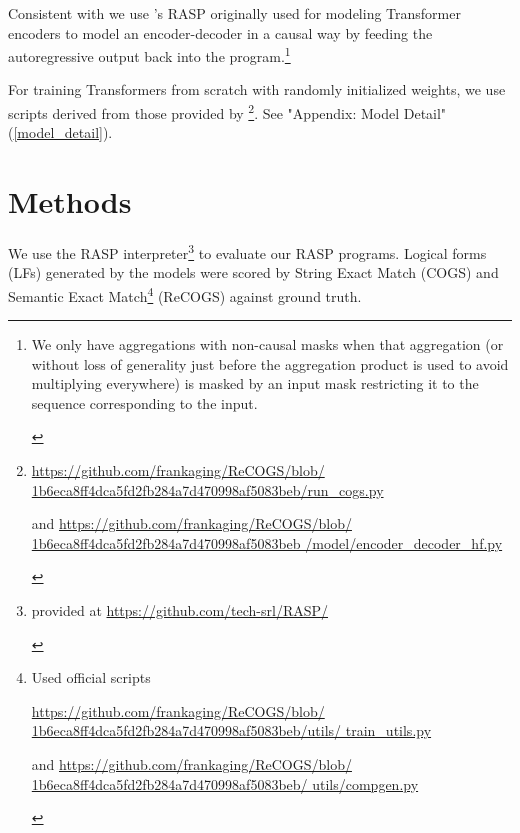\documentclass[11pt]{article}
\begin{document}
Consistent with \cite{Zhou2024} we use \cite{Weiss2021}'s RASP originally used for modeling Transformer encoders to model an encoder-decoder in a causal way by feeding the autoregressive output back into the program.\footnote{\begin{footnotesize}We only have aggregations with non-causal masks when that aggregation (or without loss of generality just before the aggregation product is used to avoid multiplying everywhere) is masked by an input mask restricting it to the sequence corresponding to the input.\end{footnotesize}}

For training Transformers from scratch with randomly initialized weights, we use scripts derived from those provided by \cite{Wu2023}\footnote{
\begin{footnotesize}\href{https://github.com/frankaging/ReCOGS/blob/1b6eca8ff4dca5fd2fb284a7d470998af5083beb/run\_cogs.py}{https://github.com/frankaging/ReCOGS/blob/
1b6eca8ff4dca5fd2fb284a7d470998af5083beb/run\_cogs.py}

and \href{https://github.com/frankaging/ReCOGS/blob/1b6eca8ff4dca5fd2fb284a7d470998af5083beb/model/encoder\_decoder\_hf.py}{https://github.com/frankaging/ReCOGS/blob/
1b6eca8ff4dca5fd2fb284a7d470998af5083beb
/model/encoder\_decoder\_hf.py} 
\end{footnotesize}
}. See "Appendix: Model Detail" (\ref{model_detail}).
\section{Methods}
We use the RASP \cite{Weiss2021} interpreter\footnote{\begin{footnotesize}provided at \href{https://github.com/tech-srl/RASP/}{https://github.com/tech-srl/RASP/}
\end{footnotesize}
} to evaluate our RASP programs. Logical forms (LFs) generated by the models were scored by String Exact Match (COGS) and Semantic Exact Match\footnote{\begin{footnotesize}Used official scripts

\href{https://github.com/frankaging/ReCOGS/blob/1b6eca8ff4dca5fd2fb284a7d470998af5083beb/utils/train\_utils.py}{https://github.com/frankaging/ReCOGS/blob/
1b6eca8ff4dca5fd2fb284a7d470998af5083beb/utils/
train\_utils.py} 

and \href{https://github.com/frankaging/ReCOGS/blob/1b6eca8ff4dca5fd2fb284a7d470998af5083beb/utils/compgen.py}{https://github.com/frankaging/ReCOGS/blob/
1b6eca8ff4dca5fd2fb284a7d470998af5083beb/
utils/compgen.py}
\end{footnotesize}
} (ReCOGS) against ground truth.%
\end{document}
